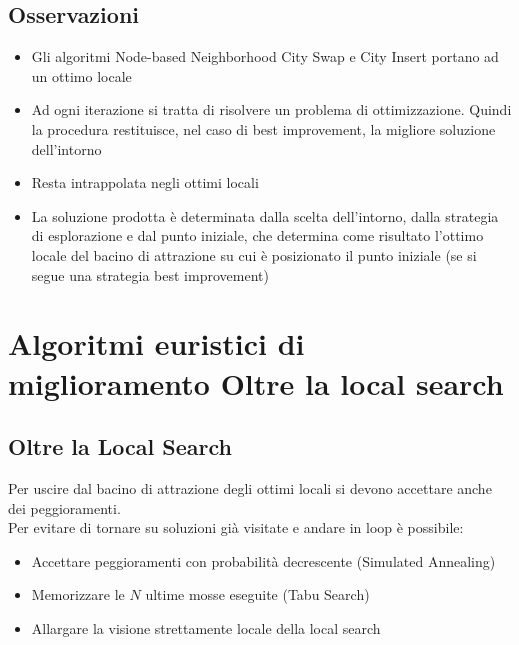 \documentclass[9pt]{beamer}
\begin{document}
\subsection{Osservazioni}
\begin{frame}{\subsecname}

	\begin{itemize}
	
		\item
		Gli algoritmi Node-based Neighborhood City Swap e City Insert portano ad un ottimo locale

		\item
		Ad ogni iterazione si tratta di risolvere un problema di ottimizzazione. Quindi la procedura restituisce, nel caso di best improvement, la migliore soluzione dell’intorno

		\item
		Resta intrappolata negli ottimi locali

		\item
		La soluzione prodotta è determinata dalla scelta dell’intorno, dalla strategia di esplorazione e dal punto iniziale, che determina come risultato l’ottimo locale del bacino di attrazione su cui è posizionato il punto iniziale (se si segue una strategia best improvement)
		
	\end{itemize}

\end{frame}

\section{Algoritmi euristici di miglioramento\newline
\footnotesize{Oltre la local search}}

\subsection{Oltre la Local Search}
\begin{frame}{\subsecname}
	
	Per uscire dal bacino di attrazione degli ottimi locali si devono accettare anche dei peggioramenti. \\
	Per evitare di tornare su soluzioni già visitate e andare in loop è possibile:
	\begin{itemize}
		\item
		Accettare peggioramenti con probabilità decrescente (Simulated Annealing)
		\item
		Memorizzare le $N$ ultime mosse eseguite (Tabu Search)
		\item
		Allargare la visione strettamente locale della local search
	\end{itemize}

\end{frame}
\end{document}
